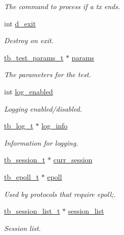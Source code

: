\begin{DoxyCompactItemize}
\begin{DoxyCompactList}\small\item\em The command to process if a tx ends. \end{DoxyCompactList}\item 
int \hyperlink{structtb__listener__t_a73b88865af668ff87dacd74c1f838da6}{d\-\_\-exit}
\begin{DoxyCompactList}\small\item\em Destroy on exit. \end{DoxyCompactList}\item 
\hyperlink{structtb__test__params__t}{tb\-\_\-test\-\_\-params\-\_\-t} $\ast$ \hyperlink{structtb__listener__t_ada07b15315fdcc71589ed7b50faec50a}{params}
\begin{DoxyCompactList}\small\item\em The parameters for the test. \end{DoxyCompactList}\item 
int \hyperlink{structtb__listener__t_a511e73c6f56fe64b24f9261939aec65f}{log\-\_\-enabled}
\begin{DoxyCompactList}\small\item\em Logging enabled/disabled. \end{DoxyCompactList}\item 
\hyperlink{structtb__log__t}{tb\-\_\-log\-\_\-t} $\ast$ \hyperlink{structtb__listener__t_a206b8711b0b270577f073bdc99b0917d}{log\-\_\-info}
\begin{DoxyCompactList}\small\item\em Information for logging. \end{DoxyCompactList}\item 
\hyperlink{structtb__session__t}{tb\-\_\-session\-\_\-t} $\ast$ \hyperlink{structtb__listener__t_a77b5086c18c650adfe86a3489057d9f9}{curr\-\_\-session}
\item 
\hyperlink{structtb__epoll__t}{tb\-\_\-epoll\-\_\-t} $\ast$ \hyperlink{structtb__listener__t_af7fbbda1b15f6051fb8cead0ada5ce7e}{epoll}
\begin{DoxyCompactList}\small\item\em Used by protocols that require epoll;. \end{DoxyCompactList}\item 
\hyperlink{structtb__session__list__t}{tb\-\_\-session\-\_\-list\-\_\-t} $\ast$ \hyperlink{structtb__listener__t_a948f8e60166821d3db232c56a59b195c}{session\-\_\-list}
\begin{DoxyCompactList}\small\item\em Session list. \end{DoxyCompactList}\item 

\end{DoxyCompactItemize}
